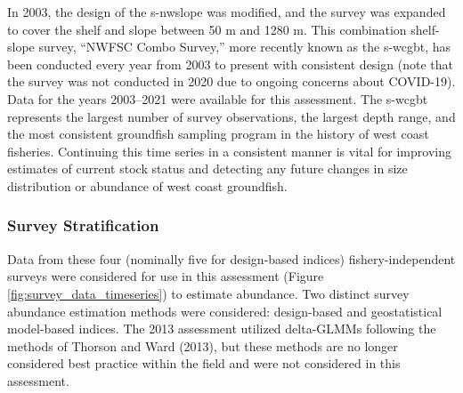 \documentclass[11pt,
  english,
  letterpaper,
]{article}
\begin{document}
In 2003, the design of the \gls{s-nwslope} was modified, and the survey was expanded to cover the shelf and slope between 50 m and 1280 m. This combination shelf-slope survey, ``NWFSC Combo Survey,'' more recently known as the \gls{s-wcgbt}, has been conducted every year from 2003 to present with consistent design (note that the survey was not conducted in 2020 due to ongoing concerns about COVID-19). Data for the years 2003--2021 were available for this assessment. The \gls{s-wcgbt} represents the largest number of survey observations, the largest depth range, and the most consistent groundfish sampling program in the history of west coast fisheries. Continuing this time series in a consistent manner is vital for improving estimates of current stock status and detecting any future changes in size distribution or abundance of west coast groundfish.

\hypertarget{survey-stratification}{%
\subsubsection{Survey Stratification}\label{survey-stratification}}

Data from these four (nominally five for design-based indices) fishery-independent surveys were considered for use in this assessment (Figure \ref{fig:survey_data_timeseries}) to estimate abundance. Two distinct survey abundance estimation methods were considered: design-based and geostatistical model-based indices. The 2013 assessment utilized delta-GLMMs following the methods of Thorson and Ward (2013), but these methods are no longer considered best practice within the field and were not considered in this assessment.
\end{document}
